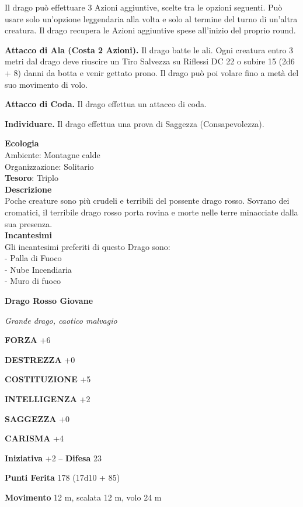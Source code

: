 \begin{multicols}{2}
	Il drago può effettuare 3 Azioni aggiuntive, scelte tra le opzioni seguenti. Può usare solo un'opzione leggendaria alla volta e solo al termine del turno di un'altra creatura. Il drago recupera le Azioni aggiuntive spese all'inizio del proprio round.

	\textbf{Attacco di Ala (Costa 2 Azioni).} Il drago batte le ali. Ogni creatura entro 3 metri dal drago deve riuscire un Tiro Salvezza su Riflessi DC 22 o subire 15 (2d6 + 8) danni da botta e venir gettato prono. Il drago può poi volare fino a metà del suo movimento di volo.

	\textbf{Attacco di Coda.} Il drago effettua un attacco di coda.

	\textbf{Individuare.} Il drago effettua una prova di Saggezza (Consapevolezza).

	\textbf{Ecologia}\\
	Ambiente: Montagne calde\\
	Organizzazione: Solitario\\
	\textbf{Tesoro}: Triplo\\
	\textbf{Descrizione}\\
	Poche creature sono più crudeli e terribili del possente drago rosso. Sovrano dei cromatici, il terribile drago rosso porta rovina e morte nelle terre minacciate dalla sua presenza.\\
	\textbf{Incantesimi}\\
	Gli incantesimi preferiti di questo Drago sono:\\
	- Palla di Fuoco\\
	- Nube Incendiaria\\
	- Muro di fuoco


	\medskip{}\textbf{Drago Rosso Giovane}

	\textit{Grande drago, caotico malvagio}

	\textbf{FORZA} +6

	\textbf{DESTREZZA} +0

	\textbf{COSTITUZIONE} +5

	\textbf{INTELLIGENZA} +2

	\textbf{SAGGEZZA} +0

	\textbf{CARISMA} +4

	\textbf{Iniziativa} +2 -- \textbf{Difesa} 23

	\textbf{Punti Ferita} 178 (17d10 + 85)

	\textbf{Movimento} 12 m, scalata 12 m, volo 24 m


\end{multicols}
